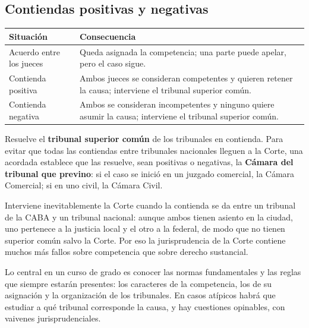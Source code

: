 \documentclass[12pt,oneside]{book}
\renewcommand{\arraystretch}{1.15}
\begin{document}
\subsection{Contiendas positivas y negativas}

\begin{table}[H]
\centering
\renewcommand{\arraystretch}{1.3}
\begin{tabularx}{\textwidth}{>{\RaggedRight\arraybackslash}p{}>{\RaggedRight\arraybackslash}X}
\toprule
\textbf{Situación} & \textbf{Consecuencia} \\
\midrule
Acuerdo entre los jueces & Queda asignada la competencia; una parte puede apelar, pero el caso sigue. \\
\addlinespace
Contienda positiva & Ambos jueces se consideran competentes y quieren retener la causa; interviene el tribunal superior común. \\
\addlinespace
Contienda negativa & Ambos se consideran incompetentes y ninguno quiere asumir la causa; interviene el tribunal superior común. \\
\bottomrule
\end{tabularx}
\end{table}

Resuelve el \textbf{tribunal superior común} de los tribunales en contienda. Para evitar que todas las contiendas entre tribunales nacionales lleguen a la Corte, una acordada establece que las resuelve, sean positivas o negativas, la \textbf{Cámara del tribunal que previno}: si el caso se inició en un juzgado comercial, la Cámara Comercial; si en uno civil, la Cámara Civil.

Interviene inevitablemente la Corte cuando la contienda se da entre un tribunal de la CABA y un tribunal nacional: aunque ambos tienen asiento en la ciudad, uno pertenece a la justicia local y el otro a la federal, de modo que no tienen superior común salvo la Corte. Por eso la jurisprudencia de la Corte contiene muchos más fallos sobre competencia que sobre derecho sustancial.

\begin{importante}
Lo central en un curso de grado es conocer las normas fundamentales y las reglas que siempre estarán presentes: los caracteres de la competencia, los de su asignación y la organización de los tribunales. En casos atípicos habrá que estudiar a qué tribunal corresponde la causa, y hay cuestiones opinables, con vaivenes jurisprudenciales.
\end{importante}
\end{document}
